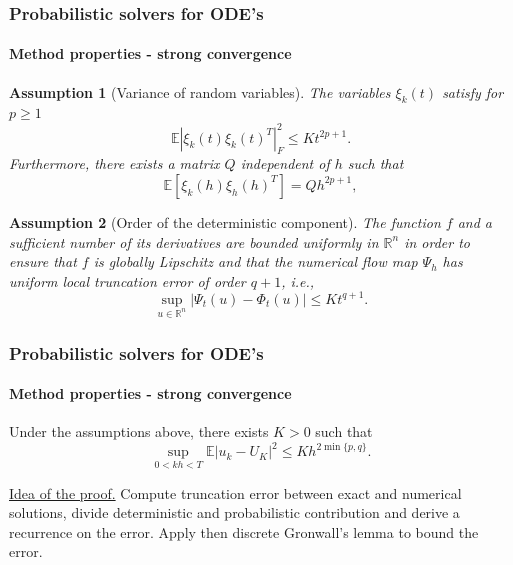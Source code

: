 \documentclass{beamer}
\newcommand{\R}{\mathbb{R}}
\newcommand{\E}{\mathbb{E}}
\newtheorem{assumption}{Assumption}
\begin{document}
\begin{frame}
	\frametitle{Probabilistic solvers for ODE's}
	\framesubtitle{Method properties - strong convergence \cite{CGS16}}
	
	\begin{assumption}[Variance of random variables] The variables $\xi_k(t)$ satisfy for $p \geq 1$
		\begin{equation*}
			\E|\xi_k(t)\xi_k(t)^T|^2_F \leq Kt^{2p+1}.
		\end{equation*}
		Furthermore, there exists a matrix $Q$ independent of $h$ such that 
		\begin{equation*}
		\E[\xi_k(h)\xi_h(h)^T] = Qh^{2p+1},
		\end{equation*}
	\end{assumption}
		
	\begin{assumption}[Order of the deterministic component] The function $f$ and a sufficient number of its derivatives are bounded uniformly in $\R^n$ in order to ensure that $f$ is globally Lipschitz and that the numerical flow map $\Psi_h$ has uniform local truncation error of order $q + 1$, i.e., 
		\begin{equation*}
			\sup_{u\in\R^n} |\Psi_t(u) - \Phi_t(u)| \leq Kt^{q+1}.
		\end{equation*}
	\end{assumption}	
\end{frame}

\begin{frame}
	\frametitle{Probabilistic solvers for ODE's}
	\framesubtitle{Method properties - strong convergence \cite{CGS16}}
	
	\begin{theorem} Under the assumptions above, there exists $K>0$ such that
		\begin{equation*}
		\sup_{0<kh<T} \E|u_k - U_K|^2 \leq Kh^{2\min\{p,q\}}.
		\end{equation*}
	\end{theorem}
	
	\underline{Idea of the proof.} Compute truncation error between exact and numerical solutions, divide deterministic and probabilistic contribution and derive a recurrence on the error. Apply then discrete Gronwall's lemma to bound the error.
\end{frame}
\end{document}
